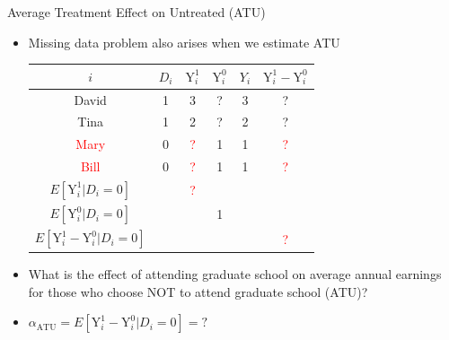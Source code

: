 \documentclass[hyperref={pdfpagelabels=false}]{beamer}
\begin{document}
\begin{frame}{Average Treatment Effect on Untreated (ATU)}
	\begin{itemize}
		\item Missing data problem also arises when we estimate ATU
		\vspace{0.2cm} 
	\begin{center}
		\begin{threeparttable}
			\centering\footnotesize
			\begin{tabular}{cccccc}
				\toprule
				$i$ & $D_i$ & $\mathrm{Y}^{1}_{i}$ & $\mathrm{Y}^{0}_{i}$ & $Y_i$ & $\mathrm{Y}^{1}_{i}-\mathrm{Y}^{0}_{i}$  \\
				\midrule
				David & 1 & 3 & ? & 3 & ? \\
				Tina & 1 & 2 & ? & 2 & ? \\
				\textcolor{red}{Mary} & 0 & \textcolor{red}? & 1 & 1 & \textcolor{red}? \\
				\textcolor{red}{Bill} & 0 & \textcolor{red}? & 1 & 1 & \textcolor{red}? \\
				\midrule
				$E[\mathrm{Y}^{1}_{i} | D_i=0]$     & & \textcolor{red}? &     &  &     \\
				$E[\mathrm{Y}^{0}_{i} | D_i=0]$     & &     & 1 &  &     \\
				\midrule
				$E[\mathrm{Y}^{1}_{i} - \mathrm{Y}^{0}_{i} | D_i=0]$ & &     &     &  & \textcolor{red}? \\
				\bottomrule
			\end{tabular}
		\end{threeparttable}
	\end{center}
	
		\vspace{0.2cm}
		\item What is the effect of attending graduate school on average annual earnings for those who choose NOT to attend graduate school (ATU)?
		\vspace{0.2cm}
		\item $\alpha_{\text{ATU}}=E[\mathrm{Y}^{1}_{i} - \mathrm{Y}^{0}_{i} | D_i=0]=?$
	\end{itemize}
	
\end{frame}
\end{document}
